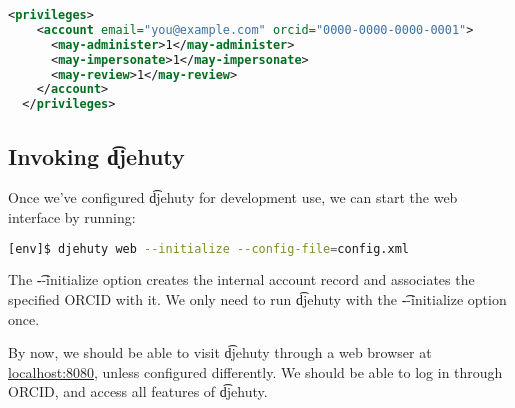 \begin{lstlisting}[language=xml]
  <privileges>
    <account email="you@example.com" orcid="0000-0000-0000-0001">
      <may-administer>1</may-administer>
      <may-impersonate>1</may-impersonate>
      <may-review>1</may-review>
    </account>
  </privileges>
\end{lstlisting}

\subsection{Invoking \t{djehuty}}

Once we've configured \t{djehuty} for development use, we can start the web
interface by running:

\begin{lstlisting}[language=bash]
[env]$ djehuty web --initialize --config-file=config.xml
\end{lstlisting}

The \t{-{}-initialize} option creates the internal account record and
associates the specified ORCID with it.  We only need to run \t{djehuty}
with the \t{-{}-initialize} option once.

By now, we should be able to visit \t{djehuty} through a web browser at
\href{http://127.0.0.1:8080}{localhost:8080}, unless configured differently.
We should be able to log in through ORCID, and access all features of
\t{djehuty}.
